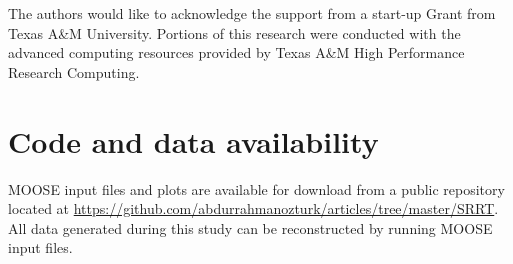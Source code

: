 \documentclass[utf8]{frontiersSCNS} %
\begin{document}
The authors would like to acknowledge the support from a start-up Grant from Texas A\&M University. Portions of this research were conducted with the advanced computing resources provided by Texas A\&M High Performance Research Computing.         

\section*{Code and data availability}

MOOSE input files and plots are available for download from a public repository located at
\href{https://github.com/abdurrahmanozturk/articles/tree/master/SRRT}{https://github.com/abdurrahmanozturk/articles/tree/master/SRRT}. All data generated during this study can be reconstructed by running MOOSE input files.
\clearpage


\end{document}

